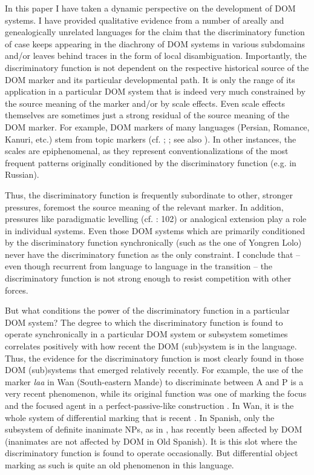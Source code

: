 \documentclass[output=paper]{langsci/langscibook}
\begin{document}
In this paper I have taken a dynamic perspective on the development of DOM systems. I have provided qualitative evidence from a number of areally and genealogically unrelated languages for the claim that the discriminatory function of case keeps appearing in the diachrony of DOM systems in various subdomains and/or leaves behind traces in the form of local disambiguation. Importantly, the discriminatory function is not dependent on the respective historical source of the DOM marker and its particular developmental path. It is only the range of its application in a particular DOM system that is indeed very much constrained by the source meaning of the marker and/or by scale effects. Even scale effects themselves are sometimes just a strong residual of the source meaning of the DOM marker. For example, DOM markers of many languages (Persian, Romance, Kanuri, etc.) stem from topic markers (cf. \citealt{Iemmolo2010}; \citealt{DalrympleNikolaeva2011}; see also \citealt{Cristofaro2019 [this volume]}). In other instances, the scales are epiphenomenal, as they represent conventionalizations of the most frequent patterns originally conditioned by the discriminatory function (e.g. in Russian).

Thus, the discriminatory function is frequently subordinate to other, stronger pressures, foremost the source meaning of the relevant marker. In addition, pressures like paradigmatic levelling (cf. \citealt{Jäger2007}: 102) or analogical extension play a role in individual systems. Even those DOM systems which are primarily conditioned by the discriminatory function synchronically (such as the one of Yongren Lolo) never have the discriminatory function as the only constraint. I conclude that – even though recurrent from language to language in the transition – the discriminatory function is not strong enough to resist competition with other forces. 

But what conditions the power of the discriminatory function in a particular DOM system? The degree to which the discriminatory function is found to operate synchronically in a particular DOM system or subsystem sometimes correlates positively with how recent the DOM (sub)system is in the language. Thus, the evidence for the discriminatory function is most clearly found in those DOM (sub)systems that emerged relatively recently. For example, the use of the marker \textit{laa} in Wan (South-eastern Mande) to discriminate between A and P is a very recent phenomenon, while its original function was one of marking the focus and the focused agent in a perfect-passive-like construction \citep{Nikitina2018}. In Wan, it is the whole system of differential marking that is recent \citep{Nikitina2018}. In Spanish, only the subsystem of definite inanimate NPs, as in , has recently been affected by DOM (inanimates are not affected by DOM in Old Spanish). It is this slot where the discriminatory function is found to operate occasionally. But differential object marking as such is quite an old phenomenon in this language.
\end{document}
